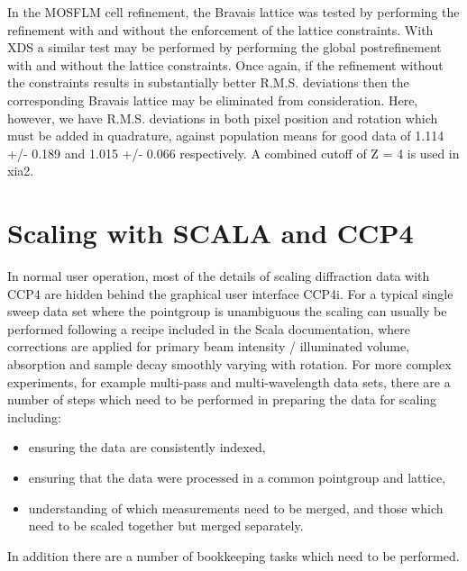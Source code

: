 \documentclass[a4paper, 11pt]{article}
\begin{document}
In the MOSFLM cell refinement, the Bravais lattice was tested by performing the refinement with and without the enforcement of the lattice constraints. With XDS a similar test may be performed by performing the global postrefinement with and without the lattice constraints. Once again, if the refinement without the constraints results in substantially better R.M.S. deviations then the corresponding Bravais lattice may be eliminated from consideration. Here, however, we have R.M.S. deviations in both pixel position and rotation which must be added in quadrature, against population means for good data of 1.114 +/- 0.189 and 1.015 +/- 0.066 respectively. A combined cutoff of Z = 4 is used in xia2.

\section{Scaling with SCALA and CCP4}

In normal user operation, most of the details of scaling diffraction data with CCP4 are hidden behind the graphical user interface CCP4i. For a typical single sweep data set where the pointgroup is unambiguous the scaling can usually be performed following a recipe included in the Scala documentation, where corrections are applied for primary beam intensity / illuminated volume, absorption and sample decay smoothly varying with rotation. For more complex experiments, for example multi-pass and multi-wavelength data sets, there are a number of steps which need to be performed in preparing the data for scaling including:

\begin{itemize}
\item{ensuring the data are consistently indexed,}
\item{ensuring that the data were processed in a common pointgroup and lattice,}
\item{understanding of which measurements need to be merged, and those which need to be scaled together but merged separately.}
\end{itemize}

\noindent
In addition there are a number of bookkeeping tasks which need to be performed. 
\end{document}
